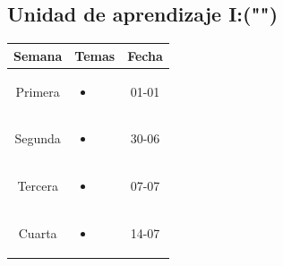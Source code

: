 \documentclass[a4paper]{article}
\begin{document}
\subsection{Unidad de aprendizaje I:("")}
\begin{table}[ht]
\centering
\begin{tabular}{|c|c|c|}
\hline
\textbf{Semana} & \textbf{Temas} & \textbf{Fecha} \\ 
\hline
Primera 
& \begin{minipage}[t]{10cm}
\begin{itemize}
\item 
\end{itemize}
\end{minipage} & 01-01\\ 
\hline 
Segunda 
& \begin{minipage}[t]{10cm}
\begin{itemize}
\item 
\end{itemize}
\end{minipage} & 30-06\\ 
\hline 
Tercera 
& \begin{minipage}[t]{10cm}
\begin{itemize}
\item 
\end{itemize}
\end{minipage} & 07-07 \\ 
\hline 
Cuarta 
& \begin{minipage}[t]{10cm}
\begin{itemize}
\item 
\end{itemize}
\end{minipage} & 14-07 \\ 
\hline 
\end{tabular}
\end{table} 
\newpage
\end{document}
